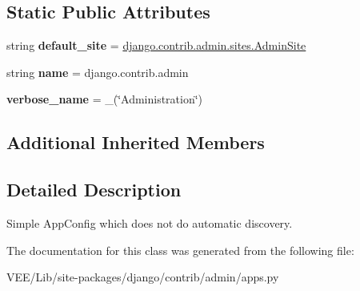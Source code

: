 \subsection*{Static Public Attributes}
\begin{DoxyCompactItemize}
\item 
\mbox{\label{classdjango_1_1contrib_1_1admin_1_1apps_1_1_simple_admin_config_a034e5f49c004889214fcb335a666365e}} 
string {\bfseries default\+\_\+site} = \textquotesingle{}\mbox{\hyperlink{classdjango_1_1contrib_1_1admin_1_1sites_1_1_admin_site}{django.\+contrib.\+admin.\+sites.\+Admin\+Site}}\textquotesingle{}
\item 
\mbox{\label{classdjango_1_1contrib_1_1admin_1_1apps_1_1_simple_admin_config_a884a1380ae720c93fca2b1dfcb22c25e}} 
string {\bfseries name} = \textquotesingle{}django.\+contrib.\+admin\textquotesingle{}
\item 
\mbox{\label{classdjango_1_1contrib_1_1admin_1_1apps_1_1_simple_admin_config_aaff1c29fbcfe034660cb3fcb0c318c57}} 
{\bfseries verbose\+\_\+name} = \+\_\+(\char`\"{}Administration\char`\"{})
\end{DoxyCompactItemize}
\subsection*{Additional Inherited Members}


\subsection{Detailed Description}
\begin{DoxyVerb}Simple AppConfig which does not do automatic discovery.\end{DoxyVerb}
 

The documentation for this class was generated from the following file\+:\begin{DoxyCompactItemize}
\item 
V\+E\+E/\+Lib/site-\/packages/django/contrib/admin/apps.\+py\end{DoxyCompactItemize}

